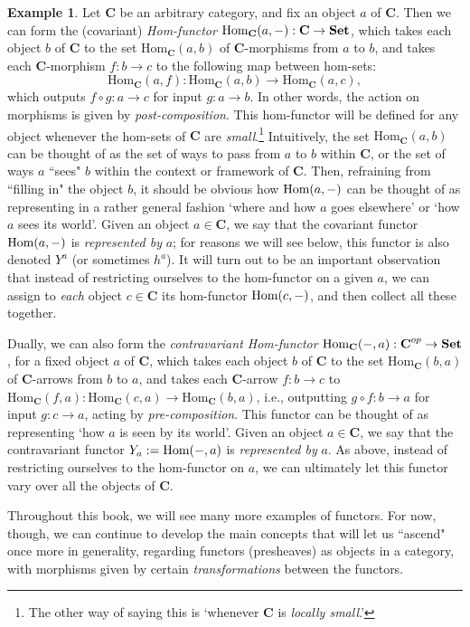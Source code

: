 \documentclass[a4paper]{book}
\theoremstyle{definition}
\newtheorem{example}{Example}[section]
\theoremstyle{definition}
\theoremstyle{definition}
\theoremstyle{theorem}
\theoremstyle{definition}
\begin{document}
\begin{example} 
	\label{example: hom-functor}
	Let \textbf{C} be an arbitrary category, and fix an object $a$ of \textbf{C}. Then we can form the (covariant) \textit{Hom-functor} $\text{Hom}_{\textbf{C}}(a,\--): \textbf{C} \rightarrow \textbf{Set}$, which takes each object $b$ of \textbf{C} to the set $\text{Hom}_{\textbf{C}}(a,b)$ of $\textbf{C}$-morphisms from $a$ to $b$, and takes each \textbf{C}-morphism $f: b \rightarrow c$ to the following map between hom-sets: \begin{equation} \text{Hom}_{\textbf{C}}(a,f): \text{Hom}_{\textbf{C}}(a,b) \rightarrow \text{Hom}_{\textbf{C}}(a,c),
	\end{equation} 
	which outputs $f \circ g: a \rightarrow c$ for input $g: a \rightarrow b$. In other words, the action on morphisms is given by \textit{post-composition}. This hom-functor will be defined for any object whenever the hom-sets of $\textbf{C}$ are \textit{small}.\footnote{The other way of saying this is `whenever \textbf{C} is \textit{locally small}.'} Intuitively, the set $\text{Hom}_{\textbf{C}}(a,b)$ can be thought of as the set of ways to pass from $a$ to $b$ within \textbf{C}, or the set of ways $a$ ``sees" $b$ within the context or framework of \textbf{C}. Then, refraining from ``filling in" the object $b$, it should be obvious how $\text{Hom}(a,\--)$ can be thought of as representing in a rather general fashion `where and how $a$ goes elsewhere' or `how $a$ sees its world'. Given an object $a \in \textbf{C}$, we say that the covariant functor $\text{Hom}(a, \--)$ is \textit{represented by} $a$; for reasons we will see below, this functor is also denoted $Y^a$ (or sometimes $h^a$). It will turn out to be an important observation that instead of restricting ourselves to the hom-functor on a given $a$, we can assign to \textit{each} object $c \in \textbf{C}$ its hom-functor $\text{Hom}(c, \--)$, and then collect all these together.\par 
	Dually, we can also form the \textit{contravariant Hom-functor} $\text{Hom}_{\textbf{C}}(\--,a): \textbf{C}^{op} \rightarrow \textbf{Set}$, for a fixed object $a$ of \textbf{C}, which takes each object $b$ of \textbf{C} to the set $\text{Hom}_{\textbf{C}}(b,a)$ of $\textbf{C}$-arrows from $b$ to $a$, and takes each \textbf{C}-arrow $f: b \rightarrow c$ to $\text{Hom}_{\textbf{C}}(f,a): \text{Hom}_{\textbf{C}}(c,a) \rightarrow \text{Hom}_{\textbf{C}}(b,a)$, i.e., outputting $g \circ f: b \rightarrow a$ for input $g: c \rightarrow a$, acting by \textit{pre-composition}. This functor can be thought of as representing `how $a$ is seen by its world'. Given an object $a \in \textbf{C}$, we say that the contravariant functor $Y_a := \text{Hom}(\--,a)$ is \textit{represented by} $a$. As above, instead of restricting ourselves to the hom-functor on $a$, we can ultimately let this functor vary over all the objects of \textbf{C}.
\end{example}
Throughout this book, we will see many more examples of functors. For now, though, we can continue to develop the main concepts that will let us ``ascend" once more in generality, regarding functors (presheaves) as objects in a category, with morphisms given by certain \textit{transformations} between the functors.  
\end{document}
